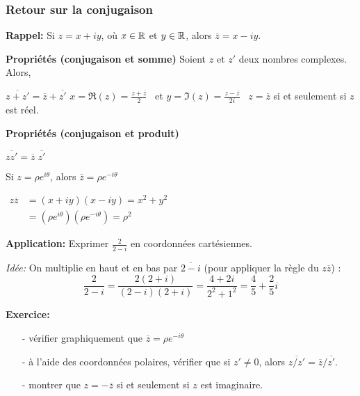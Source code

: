 \begin{frame}%
\frametitle{\bf Retour sur la conjugaison}
{\bf Rappel:} Si $z=x+iy$, où $x\in\mathbb R$ et $y\in\mathbb R$, alors $\boxed{\overline z=x-iy}$.
\medskip 

{\bf Propri\'et\'es (conjugaison et somme)} 
Soient $z$ et $z'$ deux nombres complexes. Alors,
\begin{itemize}
\bitem 
$\overline{z +z'}=\overline{z} +\overline{z'}$ 
\vspace*{2mm}
\bitem
$x=\boxed{\Re(z)=\frac{z+\overline{z}}{2}}$ \ et\quad   
$y=\boxed{\Im(z)=\frac{z-\overline{z}}{2i}}$
\vspace*{2mm}
\bitem 
{\ $z=\overline{z}$ si et seulement si $z$ est réel. }

\end{itemize}

{\bf Propri\'et\'es (conjugaison et produit)} 
\begin{itemize} 
\bitem 
$\overline{z z'}=\overline{z} \;\overline{z'}$ 

\bitem Si $z=\rho e^{i\theta}$, alors $\boxed{\overline z=\rho e^{-i\theta}}$

\bitem
$
\boxed{
\begin{aligned}
z\overline z &= (x+iy)(x-iy)=x^2+y^2\\
&=(\rho e^{i\theta})(\rho e^{-i\theta})=\rho^2
\end{aligned}
}
$
\end{itemize}

\medskip

{\small{\bf Application:} Exprimer $\frac{2}{2-i}$ en coordonnées cartésiennes.

{\it Idée:} On multiplie en haut et en bas par  $\overline{2-i}$ (pour appliquer la règle du $z\overline z$) :
$$
\frac{2}{2-i} = \frac{2(2+i)}{(2-i)(2+i)} = \frac{4+2i}{2^2+1^2} = \frac45+\frac 25i
$$
\medskip

{\bf Exercice:} 
\begin{itemize}
\item[-] vérifier graphiquement que ${\overline z=\rho e^{-i\theta}}$
\item[-] à l'aide des coordonnées polaires, vérifier que si $z'\neq0$, alors $\overline{z/z'}=\overline{z}/\overline{z'}$. 
\item[-] montrer que $z=-\overline{z}$ si et seulement si $z$ est imaginaire.
\end{itemize}}
\end{frame}

